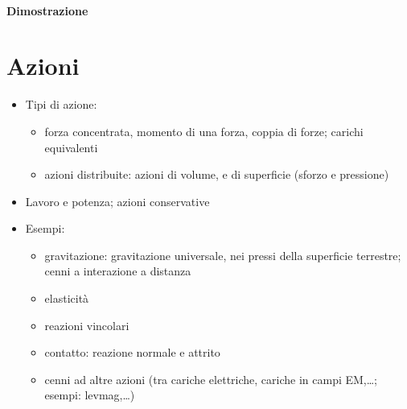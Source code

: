 \documentclass[letterpaper,10pt,italian]{jupyterBook}
\begin{document}
\subsubsection*{Dimostrazione}

\sphinxstepscope


\chapter{Azioni}
\label{\detokenize{ch/mechanics/actions:azioni}}\label{\detokenize{ch/mechanics/actions:physics-hs-mechanics-actions}}\label{\detokenize{ch/mechanics/actions::doc}}\begin{itemize}
\item {} 
\sphinxAtStartPar
Tipi di azione:
\begin{itemize}
\item {} 
\sphinxAtStartPar
forza concentrata, momento di una forza, coppia di forze; carichi equivalenti

\item {} 
\sphinxAtStartPar
azioni distribuite: azioni di volume, e di superficie (sforzo e pressione)

\end{itemize}

\item {} 
\sphinxAtStartPar
Lavoro e potenza; azioni conservative

\item {} 
\sphinxAtStartPar
Esempi:
\begin{itemize}
\item {} 
\sphinxAtStartPar
gravitazione: gravitazione universale, nei pressi della superficie terrestre; cenni a interazione a distanza

\item {} 
\sphinxAtStartPar
elasticità

\item {} 
\sphinxAtStartPar
reazioni vincolari

\item {} 
\sphinxAtStartPar
contatto: reazione normale e attrito

\item {} 
\sphinxAtStartPar
cenni ad altre azioni (tra cariche elettriche, cariche in campi EM,…; esempi: levmag,…)

\end{itemize}

\end{itemize}
\end{document}
